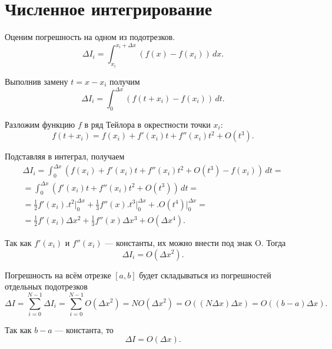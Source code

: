 \section{Численное интегрирование}


Оценим погрешность на одном из подотрезков.
\[
\Delta I_i = \int_{x_i}^{x_i+\Delta x} (f(x) - f(x_i))\,dx.
\]

Выполнив замену $t = x - x_i$ получим
\[
\Delta I_i = \int_0^{\Delta x} (f(t + x_i) - f(x_i))\, dt.
\]

Разложим функцию $f$ в ряд Тейлора в окрестности точки $x_i$:
\[
    f(t + x_i) = f(x_i) + f'(x_i)t + f''(x_i)t^2 + O(t^3).
\]

Подставляя в интеграл, получаем
\begin{multline*}
\Delta I_i = \int_0^{\Delta x} \left(f(x_i) + f'(x_i)t + f''(x_i)t^2 + O(t^3) - f(x_i)\right)\,dt =\\
=\int_0^{\Delta x}\left(f'(x_i)t + f''(x_i)t^2 + O(t^3)\right)\,dt=\\
=\frac12 f'(x_i) \bigl. t^2 \bigr|_{0}^{\Delta x} + \frac13 f''(x) \bigl. t^3 \bigr|_{0}^{\Delta x} +  \bigl.O(t^4) \bigr|_{0}^{\Delta x}=\\
=\frac12 f'(x_i) \Delta x^2 + \frac13 f''(x) \Delta x^3 + O(\Delta x^4).
\end{multline*}

Так как $f'(x_i)$ и $f''(x_i)$ — константы, их можно внести под знак O. Тогда
\[
\Delta I_i = O(\Delta x^2).
\]

Погрешность на всём отрезке $[a, b]$ будет складываться из погрешностей отдельных подотрезков
\[
\Delta I = \sum_{i=0}^{N-1}\Delta I_i = \sum_{i=0}^{N-1}O(\Delta x^2) = N O(\Delta x^2) = O((N \Delta x) \Delta x) = O((b-a)\Delta x).
\]

Так как $b-a$ — константа, то
\[
\Delta I = O(\Delta x).
\]